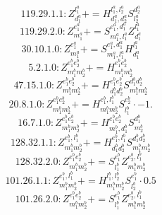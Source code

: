 \documentclass[letterpaper,10pt,fleqn,leqno,onecolumn]{article}
\begin{document}
\begin{equation} \;\;\;\;\;\;  119.29.1.1: Z^{l_{1}^{a}}_{d_{1}^{a}}+=H^{l_{1}^{a},l_{2}^{a}}_{d_{1}^{a},d_{2}^{a}}S^{d_{2}^{a}}_{l_{2}^{a}} \end{equation}
\begin{equation} \;\;\;\;\;\;  119.29.2.0: Z^{e_{1}^{a}}_{m_{1}^{a}}+=S^{e_{1}^{a},d_{1}^{a}}_{m_{1}^{a},l_{1}^{a}}Z^{l_{1}^{a}}_{d_{1}^{a}} \end{equation}
\begin{equation} \;\;\;\;\;\;  30.10.1.0: Z^{e_{1}^{a}}_{m_{1}^{a}}+=S^{e_{1}^{a},d_{1}^{a}}_{m_{1}^{a},l_{1}^{a}}H^{l_{1}^{a}}_{d_{1}^{a}} \end{equation}
\begin{equation} \;\;\;\;\;\;  5.2.1.0: Z^{e_{1}^{b}e_{2}^{b}}_{m_{1}^{b}m_{2}^{b}}+=H^{e_{1}^{b}e_{2}^{b}}_{m_{1}^{b}m_{2}^{b}} \end{equation}
\begin{equation} \;\;\;\;\;\;  47.15.1.0: Z^{e_{1}^{b}e_{2}^{b}}_{m_{1}^{b}m_{2}^{b}}+=H^{e_{1}^{b}e_{2}^{b}}_{d_{1}^{b}d_{2}^{b}}S^{d_{1}^{b}d_{2}^{b}}_{m_{1}^{b}m_{2}^{b}} \end{equation}
\begin{equation} \;\;\;\;\;\;  20.8.1.0: Z^{e_{1}^{b}e_{2}^{b}}_{m_{1}^{b}m_{2}^{b}}+=H^{e_{1}^{b},l_{1}^{b}}_{m_{1}^{b}m_{2}^{b}}S^{e_{2}^{b}}_{l_{1}^{b}}\cdot -1. \end{equation}
\begin{equation} \;\;\;\;\;\;  16.7.1.0: Z^{e_{1}^{b}e_{2}^{b}}_{m_{1}^{b}m_{2}^{b}}+=H^{e_{1}^{b}e_{2}^{b}}_{m_{1}^{b},d_{1}^{b}}S^{d_{1}^{b}}_{m_{2}^{b}} \end{equation}
\begin{equation} \;\;\;\;\;\;  128.32.1.1: Z^{e_{1}^{b},l_{1}^{b}}_{m_{1}^{b}m_{2}^{b}}+=H^{e_{1}^{b},l_{1}^{b}}_{d_{1}^{b}d_{2}^{b}}S^{d_{1}^{b}d_{2}^{b}}_{m_{1}^{b}m_{2}^{b}} \end{equation}
\begin{equation} \;\;\;\;\;\;  128.32.2.0: Z^{e_{1}^{b}e_{2}^{b}}_{m_{1}^{b}m_{2}^{b}}+=S^{e_{1}^{b}}_{l_{1}^{b}}Z^{e_{2}^{b},l_{1}^{b}}_{m_{1}^{b}m_{2}^{b}} \end{equation}
\begin{equation} \;\;\;\;\;\;  101.26.1.1: Z^{e_{1}^{b},l_{1}^{b}}_{m_{1}^{b}m_{2}^{b}}+=H^{l_{1}^{b},l_{2}^{b}}_{m_{1}^{b}m_{2}^{b}}S^{e_{1}^{b}}_{l_{2}^{b}}\cdot 0.5 \end{equation}
\begin{equation} \;\;\;\;\;\;  101.26.2.0: Z^{e_{1}^{b}e_{2}^{b}}_{m_{1}^{b}m_{2}^{b}}+=S^{e_{1}^{b}}_{l_{1}^{b}}Z^{e_{2}^{b},l_{1}^{b}}_{m_{1}^{b}m_{2}^{b}} \end{equation}
\end{document}
